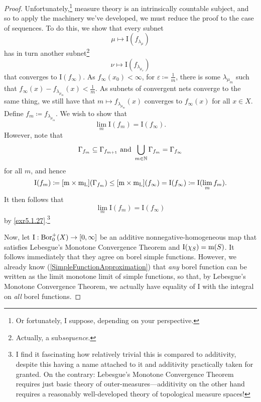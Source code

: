 \begin{thm}[Integral]
\begin{proof}
Unfortunately,\footnote{Or fortunately, I suppose, depending on your perspective.} measure theory is an intrinsically countable subject, and so to apply the machinery we've developed, we must reduce the proof to the case of sequences.  To do this, we show that every subnet
\begin{equation}
\mu \mapsto \mathrm{I}(f_{\lambda _\mu})
\end{equation}
has in turn another subnet\footnote{Actually, a sub\emph{sequence}.}
\begin{equation}
\nu \mapsto \mathrm{I}(f_{\lambda _{\mu _\nu}})
\end{equation}
that converges to $\mathrm{I}(f_\infty )$.  As $f_\infty (x_0)<\infty$, for $\varepsilon \coloneqq \frac{1}{m}$, there is some $\lambda _{\mu _m}$ such that $f_\infty (x)-f_{\lambda _{\mu _m}}(x)<\frac{1}{m}$.  As subnets of convergent nets converge to the same thing, we still have that $m\mapsto f_{\lambda _{\mu _m}}(x)$ converges to $f_\infty (x)$ for all $x\in X$.  Define $f_m\coloneqq f_{\lambda _{\mu _m}}$.  We wish to show that
\begin{equation}
\lim _m\mathrm{I}(f_m)=\mathrm{I}(f_\infty ).
\end{equation}
However, note that
\begin{equation}
\Gamma _{f_m}\subseteq \Gamma _{f_{m+1}}\text{ and }\bigcup _{m\in \mathbb{N}}\Gamma _{f_m}=\Gamma _{f_\infty}
\end{equation}
for all $m$, and hence
\begin{equation}
\mathrm{I}(f_m)\coloneqq [\mathrm{m} \times \mathrm{m}_{\mathrm{L}}](\Gamma _{f_m})\leq [\mathrm{m} \times \mathrm{m} _{\mathrm{L}}](f_\infty)=\mathrm{I}(f_\infty )\coloneqq \mathrm{I}(\lim _mf_m).
\end{equation}
It then follows that
\begin{equation}
\lim _m\mathrm{I}(f_m)=\mathrm{I}(f_\infty )
\end{equation}
by \cref{exr5.1.27}.\footnote{I find it fascinating how relatively trivial this is compared to additivity, despite this having a name attached to it and additivity practically taken for granted.  On the contrary:  Lebesgue's Monotone Convergence Theorem requires just basic theory of outer-measures---additivity on the other hand requires a reasonably well-developed theory of topological measure spaces!}

Now, let $\mathrm{I}:\operatorname{Bor} _0^+(X)\rightarrow [0,\infty ]$ be an additive nonnegative-homogeneous map that satisfies Lebesgue's Monotone Convergence Theorem and $\mathrm{I}(\chi _S)=\mathrm{m} (S)$.  It follows immediately that they agree on borel simple functions.  However, we already know (\cref{SimpleFunctionApproximation}) that \emph{any} borel function can be written as the limit monotone limit of simple functions, so that, by Lebesgue's Monotone Convergence Theorem, we actually have equality of $\mathrm{I}$ with the integral on \emph{all} borel functions.
\end{proof}
\end{thm}
